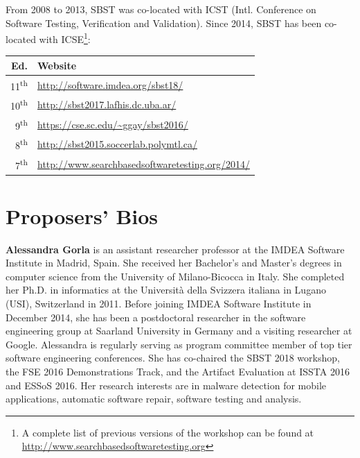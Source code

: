 \documentclass[10pt,conference]{IEEEtran}
\newcommand{\TODO}[1]{\textbf{\textcolor{ScarletRed}{[TODO: #1]}}\xspace}
\newcommand{\TODO}[1]{}
\begin{document}
From 2008 to 2013, SBST was co-located with ICST (Intl. Conference on
Software Testing, Verification and Validation). Since 2014, SBST has
been co-located with ICSE\footnote{A complete list of previous
  versions of the workshop can be found at
  \url{http://www.searchbasedsoftwaretesting.org}}:
\begin{table}[h]
\centering
\begin{tabular}{rl}\toprule
Ed. & Website \\\midrule
11\textsuperscript{th} & \url{http://software.imdea.org/sbst18/} \\
10\textsuperscript{th} & \url{http://sbst2017.lafhis.dc.uba.ar/} \\
9\textsuperscript{th}  & \url{https://cse.sc.edu/~ggay/sbst2016/} \\
8\textsuperscript{th}  & \url{http://sbst2015.soccerlab.polymtl.ca/} \\
7\textsuperscript{th}  & \url{http://www.searchbasedsoftwaretesting.org/2014/}\\\bottomrule
\end{tabular}
\end{table}


\section{Proposers' Bios}

{\bf Alessandra Gorla} is an assistant researcher professor at the
IMDEA Software Institute in Madrid, Spain. She received her Bachelor's
and Master's degrees in computer science from the University of
Milano-Bicocca in Italy. She completed her Ph.D. in informatics at the
Universit\`a della Svizzera italiana in Lugano (USI), Switzerland in
2011. Before joining IMDEA Software Institute in December 2014, she
has been a postdoctoral researcher in the software engineering group
at Saarland University in Germany and a visiting researcher at Google.
Alessandra is regularly serving as program committee member of top
tier software engineering conferences. She has co-chaired the SBST
2018 workshop, the FSE 2016 Demonstrations Track, and the Artifact
Evaluation at ISSTA 2016 and ESSoS 2016.  Her research interests are
in malware detection for mobile applications, automatic software
repair, software testing and analysis.
\end{document}
